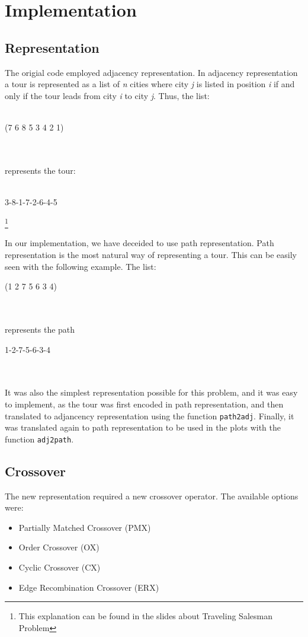 \section{Implementation}

\subsection{Representation}
The origial code employed adjacency representation. In adjacency representation a tour is represented as a list of \textit{n} cities where city \textit{j} is listed in position \textit{i} if and only if the tour leads from city \textit{i} to city \textit{j}. Thus, the list:\\
\\
\centerline{(7 6 8 5 3 4 2 1)}\\
\\
represents the tour:\\ 
\\
\centerline{3-8-1-7-2-6-4-5}\footnote{This explanation can be found in the slides about Traveling Salesman Problem}\\
\\ 
In our implementation, we have deceided to use path representation. Path representation is the most natural way of representing a tour. This can be easily seen with the following example. The list:
\\
\centerline{(1 2 7 5 6 3 4)}\\
\\
represents the path\\
\centerline{1-2-7-5-6-3-4}\\
\\
It was also the simplest representation possible for this problem, and it was easy to implement, as the tour was first encoded in path representation, and then translated to adjancency representation using the function \texttt{path2adj}. Finally, it was translated again to path representation to be used in the plots with the function \texttt{adj2path}. 

\subsection{Crossover}
  The new representation required a new crossover operator. The available options were:
  \begin{itemize}
  	\item Partially Matched Crossover (PMX)
  	\item Order Crossover (OX)
  	\item Cyclic Crossover (CX)
  	\item Edge Recombination Crossover (ERX)
  \end{itemize}

